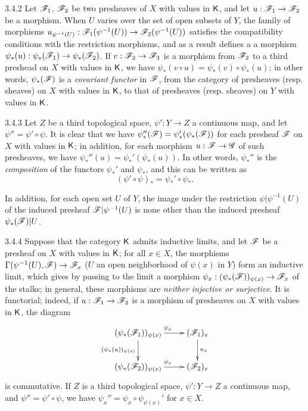 \begin{env}{3.4.2}
\label{env-0.3.4.2}
Let $\mathscr{F}_1$, $\mathscr{F}_2$ be two presheaves of $X$ with values in $\mathsf{K}$, and let
$u:\mathscr{F}_1\to\mathscr{F}_2$ be a morphism. When $U$ varies over the set of open subsets of $Y$,
the family of morphisms $u_{\psi^{-1}(U)}:\mathscr{F}_1(\psi^{-1}(U))\to\mathscr{F}_2(\psi^{-1}(U))$
satisfies the compatibility conditions with the restriction morphisms, and as a result
defines a a morphism $\psi_*(u):\psi_*(\mathscr{F}_1)\to\psi_*(\mathscr{F}_2)$. If
$v:\mathscr{F}_2\to\mathscr{F}_3$ is a morphism from $\mathscr{F}_2$ to a third preshead on $X$ with values
in $\mathsf{K}$, we have $\psi_*(v\circ u)=\psi_*(v)\circ\psi_*(u)$; in other words, $\psi_*(\mathscr{F})$
is a \emph{covariant functor} in $\mathscr{F}$, from the category of presheaves (resp. sheaves) on
$X$ with values in $\mathsf{K}$, to that of presheaves (resp. sheaves) on $Y$ with values in $\mathsf{K}$.
\end{env}

\begin{env}{3.4.3}
\label{env-0.3.4.3}
Let $Z$ be a third topological space, $\psi':Y\to Z$ a continuous map, and let
$\psi''=\psi'\circ\psi$. It is clear that we have $\psi_*''(\mathscr{F})=\psi_*'(\psi_*(\mathscr{F}))$
for each presheaf $\mathscr{F}$ on $X$ with values in $\mathsf{K}$; in addition, for each morphism
$u:\mathscr{F}\to\mathscr{G}$ of such presheaves, we have $\psi_*''(u)=\psi_*'(\psi_*(u))$. In other
words, $\psi_*''$ is the \emph{composition} of the functors $\psi_*'$ and $\psi_*$, and this
can be written as
\[
  (\psi'\circ\psi)_*=\psi_*'\circ\psi_*.
\]

In addition, for each open set $U$ of $Y$, the image under the restriction
$\psi|\psi^{-1}(U)$ of the induced presheaf $\mathscr{F}|\psi^{-1}(U)$ is none other than the
induced presheaf $\psi_*(\mathscr{F})|U$.
\end{env}

\begin{env}{3.4.4}
\label{env-0.3.4.4}
Suppose that the category $\mathsf{K}$ admits inductive limits, and let $\mathscr{F}$ be a presheaf on $X$
with values in $\mathsf{K}$; for all $x\in X$, the morphisms $\Gamma(\psi^{-1}(U),\mathscr{F})\to\mathscr{F}_x$
($U$ an open neighborhood of $\psi(x)$ in $Y$) form an inductive limit, which gives by
passing
to the limit a morphism $\psi_x:(\psi_*(\mathscr{F}))_{\psi(x)}\to\mathscr{F}_x$ of the stalks; in
general, these morphisms are \emph{neither injective or surjective}. It is functorial;
indeed, if $u:\mathscr{F}_1\to\mathscr{F}_2$ is a morphism of presheaves on $X$ with values in $\mathsf{K}$,
the diagram
\[
  \xymatrix{
    (\psi_*(\sh{F}_1))_{\psi(x)}\ar[r]^{\psi_x}\ar[d]_{(\psi_*(u))_{\psi(x)}} &
    (\sh{F}_1)_x\ar[d]^{u_x}\\
    (\psi_*(\sh{F}_2))_{\psi(x)}\ar[r]^{\psi_x} &
    (\sh{F}_2)_x
  }
\]
is commutative. If $Z$ is a third topological space, $\psi':Y\to Z$ a continuous map, and
$\psi''=\psi'\circ\psi$, we have $\psi_x''=\psi_x\circ\psi_{\psi(x)}'$ for $x\in X$.
\end{env}

